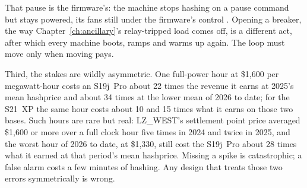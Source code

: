That pause is the firmware's: the machine stops hashing on a pause command but stays powered, its fans still under the firmware's control \autocite{braiinsacademyminerstates,braiinsacademyadvanced}. Opening a breaker, the way Chapter~\ref{ch:ancillary}'s relay-tripped load comes off, is a different act, after which every machine boots, ramps and warms up again. %
The loop must move only when moving pays.

Third, the stakes are wildly asymmetric. One full-power hour at \$1,600 per megawatt-hour costs an S19j~Pro about 22 times the revenue it earns at 2025's mean hashprice and about 34 times at the lower mean of 2026 to date; for the S21~XP the same hour costs about 10 and 15 times what it earns on those two bases. %
Such hours are rare but real: LZ\_WEST's settlement point price averaged \$1,600 or more over a full clock hour five times in 2024 and twice in 2025, and the worst hour of 2026 to date, at \$1,330, still cost the S19j~Pro about 28 times what it earned at that period's mean hashprice. %
Missing a spike is catastrophic; a false alarm costs a few minutes of hashing. Any design that treats those two errors symmetrically is wrong.

